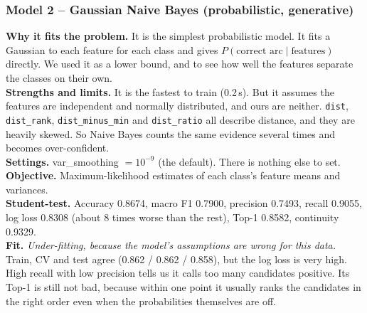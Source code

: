 \documentclass[11pt,a4paper]{article}
\newcommand{\code}[1]{\texttt{\small #1}}
\begin{document}
\subsubsection*{Model 2 -- Gaussian Naive Bayes (probabilistic, generative)}
\textbf{Why it fits the problem.} It is the simplest probabilistic model. It fits a Gaussian to each feature
for each class and gives $P(\text{correct arc}\mid\text{features})$ directly. We used it as a lower bound,
and to see how well the features separate the classes on their own.\\
\textbf{Strengths and limits.} It is the fastest to train (0.2\,s). But it assumes the features are
independent and normally distributed, and ours are neither. \code{dist}, \code{dist\_rank},
\code{dist\_minus\_min} and \code{dist\_ratio} all describe distance, and they are heavily skewed. So Naive
Bayes counts the same evidence several times and becomes over-confident.\\
\textbf{Settings.} var\_smoothing $=10^{-9}$ (the default). There is nothing else to set.\\
\textbf{Objective.} Maximum-likelihood estimates of each class's feature means and variances.\\
\textbf{Student-test.} Accuracy 0.8674, macro F1 0.7900, precision 0.7493, recall 0.9055, log loss 0.8308
(about 8 times worse than the rest), Top-1 0.8582, continuity 0.9329.\\
\textbf{Fit.} \emph{Under-fitting, because the model's assumptions are wrong for this data.} Train, CV and
test agree (0.862 / 0.862 / 0.858), but the log loss is very high. High recall with low precision tells us it
calls too many candidates positive. Its Top-1 is still not bad, because within one point it usually ranks
the candidates in the right order even when the probabilities themselves are off.
\end{document}
